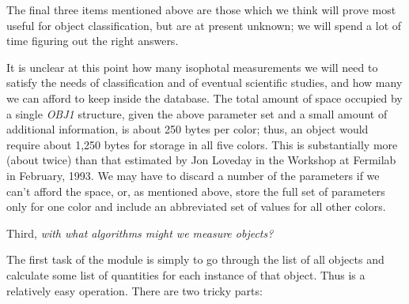  The final three items mentioned above are those which we think
will prove most useful for object classification, but are at present
unknown; we will spend a lot of time figuring out the right answers.

  It is unclear at this point how many isophotal measurements 
we will need to 
satisfy the needs of classification and of eventual scientific 
studies, and how many we can afford to keep inside the database.
The total amount of space occupied by a single {\it OBJ1} 
structure, given the above parameter set and a small amount of
additional information, is about 250 bytes per color; thus,
an object would require about 1,250 bytes for storage in all
five colors.  This is substantially more (about twice) than that estimated
by Jon Loveday in the Workshop at Fermilab in February, 1993.
We may have to discard a number of the parameters if we can't
afford the space, or, as mentioned above, store the full set of
parameters only for one color and include an abbreviated set of 
values for all other colors.

\medskip

  Third, {\it with what algorithms might we measure objects?}
 
The first task of the module is simply to go through the list of all
objects and calculate some list of quantities for each instance of that
object.  Thus is a relatively easy operation.  There are two
tricky parts:

